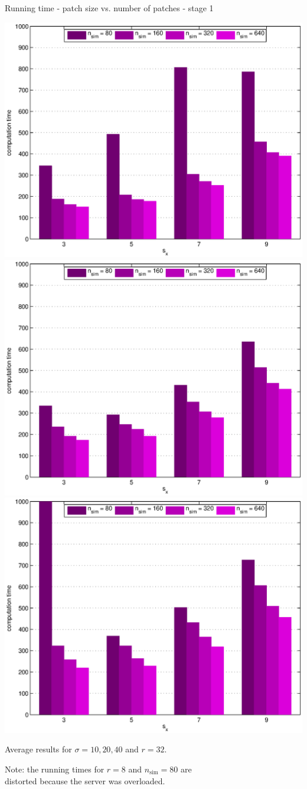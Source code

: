 \documentclass[mathserif, 8pt]{beamer}
\begin{document}
\begin{frame}{Running time - patch size vs. number of patches - stage 1}
	\begin{center}
		\includegraphics[width=.33\textwidth]{time_px1-np1-bars_1r32_s10_average.eps}%
		\includegraphics[width=.33\textwidth]{time_px1-np1-bars_1r32_s20_average.eps}%
		\includegraphics[width=.33\textwidth]{time_px1-np1-bars_1r32_s40_average.eps}
	\end{center}
	\begin{center}
	Average results for $\sigma = 10, 20, 40$ and $r = 32$.

	\bigskip

	Note: the running times for $r = 8$ and $n_{\text{sim}} = 80$ are \\
	distorted because the server was overloaded.
	\end{center}
\end{frame}
\end{document}
